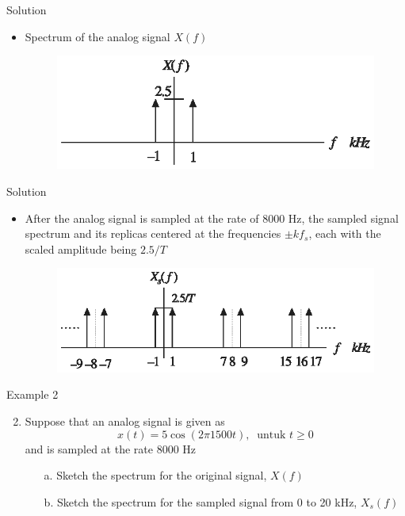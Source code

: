 \documentclass[pdflatex,compress,mathserif]{beamer}
\begin{document}
\begin{frame}{Solution}
    \begin{itemize}
        \item Spectrum of the analog signal $X(f)$
        \begin{figure}
            \includegraphics[width=\linewidth]{./img/img12}
        \end{figure}
    \end{itemize}
\end{frame}

\begin{frame}{Solution}
    \begin{itemize}
        \item After the analog signal is sampled at the rate of 8000 Hz, the sampled signal spectrum and its replicas centered at the frequencies $\pm kf_s$, each with the scaled amplitude being $2.5/T$
        \begin{figure}
            \includegraphics[width=\linewidth]{./img/img13}
        \end{figure}
    \end{itemize}
\end{frame}

\begin{frame}{Example 2}
    \begin{enumerate}
        \setcounter{enumi}{1}
        \item Suppose that an analog signal is given as
        \begin{equation*}
            x(t) = 5 \cos (2 \pi 1500 t),~\text{ untuk } t \geq 0
        \end{equation*}
        and is sampled at the rate 8000 Hz
        \begin{enumerate}
            \item[a.] Sketch the spectrum for the original signal, $X(f)$
            \item[b.] Sketch the spectrum for the sampled signal from 0 to 20 kHz, $X_s(f)$
        \end{enumerate}
    \end{enumerate}
\end{frame}
\end{document}
